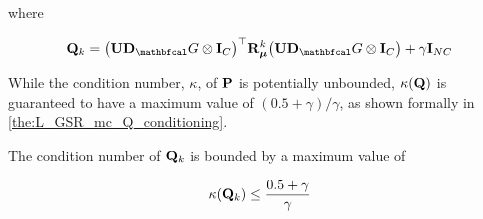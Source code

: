where 

\begin{equation}
    \label{eq:Q_LGSR_mc}
    \Q_k = \big(\U \D_\Gt \otimes \I_C\big)^\top  \RR_{\muu}^k \big(\U \D_\Gt \otimes \I_C\big) + \gamma \I_{NC}
\end{equation}

While the condition number, $\kappa$, of $\mathbf{P}$ is potentially unbounded, $\kappa(\mathbf{Q})$ is guaranteed to have a maximum value of $(0.5 + \gamma) / \gamma$, as shown formally in \cref{the:L_GSR_mc_Q_conditioning}. 

\begin{theorem}
    \label{the:L_GSR_mc_Q_conditioning}
    
    The condition number of $\mathbf{Q}_k$ is bounded by a maximum value of 
    
    \begin{equation}
        \kappa(\mathbf{Q}_k) \leq \frac{0.5 + \gamma}{\gamma}
    \end{equation}

\end{theorem}

